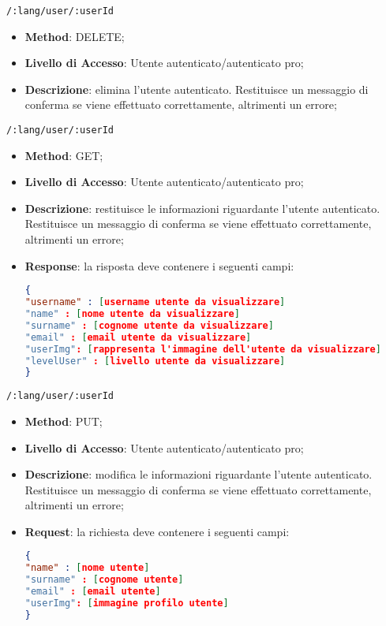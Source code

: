 \item \texttt{/:lang/user/:userId}
	\begin{itemize}
		\item \textbf{Method}: DELETE;
		\item \textbf{Livello di Accesso}: Utente autenticato/autenticato pro;
		\item \textbf{Descrizione}: elimina l'utente autenticato. Restituisce un messaggio di conferma se viene effettuato correttamente, altrimenti un errore;
	\end{itemize}	
	
	\item \texttt{/:lang/user/:userId}
		\begin{itemize}
			\item \textbf{Method}: GET;
			\item \textbf{Livello di Accesso}: Utente autenticato/autenticato pro;
			\item \textbf{Descrizione}: restituisce le informazioni riguardante l'utente autenticato. Restituisce un messaggio di conferma se viene effettuato correttamente, altrimenti un errore;
			\item \textbf{Response}: la risposta deve contenere i seguenti campi:
\begin{lstlisting}[language=json,firstnumber=1]
{
"username" : [username utente da visualizzare]
"name" : [nome utente da visualizzare]
"surname" : [cognome utente da visualizzare]
"email" : [email utente da visualizzare]
"userImg": [rappresenta l'immagine dell'utente da visualizzare]
"levelUser" : [livello utente da visualizzare]
}
\end{lstlisting}
		\end{itemize}
		
	\item \texttt{/:lang/user/:userId}
		\begin{itemize}
			\item \textbf{Method}: PUT;
			\item \textbf{Livello di Accesso}: Utente autenticato/autenticato pro;
			\item \textbf{Descrizione}: modifica le informazioni riguardante l'utente autenticato. Restituisce un messaggio di conferma se viene
effettuato correttamente, altrimenti un errore;
			\item \textbf{Request}: la richiesta deve contenere i seguenti campi:
\begin{lstlisting}[language=json,firstnumber=1]
{
"name" : [nome utente]
"surname" : [cognome utente]
"email" : [email utente]
"userImg": [immagine profilo utente]
}
\end{lstlisting}
		\end{itemize}	
		
